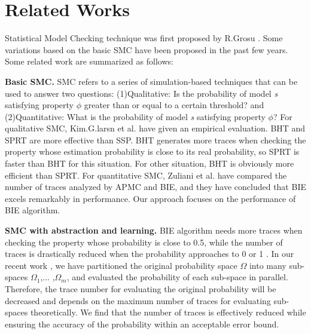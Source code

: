 \section{Related Works}
Statistical Model Checking technique was first proposed by R.Grosu \cite{grosu2005monte}. Some variations \cite{legay2010statistical} \cite{Younes2004Planning} \cite{younes2006statistical}\cite{jha2009bayesian} \cite{zuliani2013bayesian} \cite{herault2004} based on the basic SMC have been proposed in the past few years. Some related work are summarized as follows:

\textbf{Basic SMC.}
SMC refers to a series of simulation-based techniques that can be used to answer two questions: (1)Qualitative: Is the probability of model \emph{s} satisfying property $\phi$ greater than or equal to a certain threshold? and (2)Quantitative: What is the probability of model \emph{s} satisfying property $\phi$? For qualitative SMC, Kim.G.larsn et al. \cite{kim2012statistical} have given an empirical evaluation. BHT and SPRT are more effective than SSP. BHT generates more traces when checking the property whose estimation probability is close to its real probability, so SPRT is faster than BHT for this situation. For other situation, BHT is obviously more efficient than SPRT. For quantitative SMC, Zuliani et al. \cite{zuliani2013bayesian} have compared the number of traces analyzed by APMC and BIE, and they have concluded that BIE excels remarkably in performance. Our approach focuses on the performance of BIE algorithm.

\textbf{SMC with abstraction and learning.}
BIE algorithm needs more traces when checking the property whose probability is close to 0.5, while the number of traces is drastically reduced when the probability approaches to 0 or 1 \cite{zuliani2013bayesian}. In our recent work \cite{jiangkaiqiang2016}, we have partitioned the original probability space $\Omega$ into many sub-spaces $\Omega_1$,... ,$\Omega_m$, and evaluated the probability of each sub-space in parallel. Therefore, the trace number for evaluating the original probability will be decreased and depends on the maximum number of traces for evaluating sub-spaces theoretically. We find that the number of traces is effectively reduced while ensuring the accuracy of the probability within an acceptable error bound.

